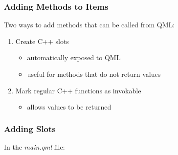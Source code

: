 \begin{slide}\frametitle{Adding Methods to Items}

Two ways to add methods that can be called from QML:

\vspace*{0.5em}
\begin{enumerate}
\item Create C++ slots
  \begin{itemize}
  \item automatically exposed to QML
  \item useful for methods that do not return values
  \end{itemize}
\item Mark regular C++ functions as invokable
  \begin{itemize}
  \item allows values to be returned
  \end{itemize}
\end{enumerate}

\end{slide}


\begin{slide}[fragile]\frametitle{Adding Slots}

In the \textit{main.qml} file:

\vspace*{0.5em}
\begin{qml}
\\
\vspace*{0.5em}
\\
\\
\\
\\
\qtt{~~~~~~~~\}}\\
\qtt{~~~~\}}\\
\vspace*{0.5em}
\\
\vspace*{0.5em}
\\
\\
\\
\\
\\
\qtt{~~~~~~~~~~~~\}}\\
\qtt{~~~~~~~~\}}\\
\qtt{~~~~\}}\\
\qtt{\}}\\
\end{qml}
\end{slide}

